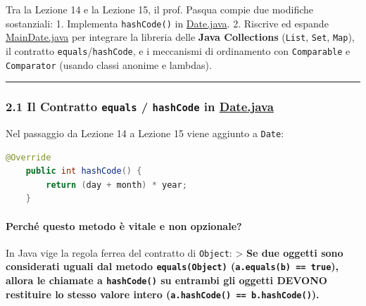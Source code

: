 \documentclass[11pt,a4paper]{article}
\newcommand{\passthrough}[1]{#1}
\begin{document}
Tra la Lezione 14 e la Lezione 15, il prof. Pasqua compie due modifiche
sostanziali: 1. Implementa \passthrough{\lstinline!hashCode()!} in
\href{file:///home/wally/Documenti/GitHub/Programmazione-II/25-26/Teoria-e-Esercitazioni/Codice-20260902/Lezione15/MavenDate/src/main/java/it/oop/core/Date.java\#L102-L105}{Date.java}.
2. Riscrive ed espande
\href{file:///home/wally/Documenti/GitHub/Programmazione-II/25-26/Teoria-e-Esercitazioni/Codice-20260902/Lezione15/MavenDate/src/main/java/it/oop/ui/MainDate.java}{MainDate.java}
per integrare la libreria delle \textbf{Java Collections}
(\passthrough{\lstinline!List!}, \passthrough{\lstinline!Set!},
\passthrough{\lstinline!Map!}), il contratto
\passthrough{\lstinline!equals!}/\passthrough{\lstinline!hashCode!}, e i
meccanismi di ordinamento con \passthrough{\lstinline!Comparable!} e
\passthrough{\lstinline!Comparator!} (usando classi anonime e lambdas).

\begin{center}\rule{0.5\linewidth}{0.5pt}\end{center}

\subsubsection{\texorpdfstring{2.1 Il Contratto \texttt{equals} /
\texttt{hashCode} in
\href{file:///home/wally/Documenti/GitHub/Programmazione-II/25-26/Teoria-e-Esercitazioni/Codice-20260902/Lezione15/MavenDate/src/main/java/it/oop/core/Date.java\#L102-L105}{Date.java}}{2.1 Il Contratto equals / hashCode in Date.java}}\label{il-contratto-equals-hashcode-in-date.java}

Nel passaggio da Lezione 14 a Lezione 15 viene aggiunto a
\passthrough{\lstinline!Date!}:

\begin{lstlisting}[language=Java]
    @Override
    public int hashCode() {
        return (day + month) * year;
    }
\end{lstlisting}

\paragraph{Perché questo metodo è vitale e non
opzionale?}\label{perchuxe9-questo-metodo-uxe8-vitale-e-non-opzionale}

In Java vige la regola ferrea del contratto di
\passthrough{\lstinline!Object!}: \textgreater{} \textbf{Se due oggetti
sono considerati uguali dal metodo
\passthrough{\lstinline!equals(Object)!}
(\passthrough{\lstinline!a.equals(b) == true!}), allora le chiamate a
\passthrough{\lstinline!hashCode()!} su entrambi gli oggetti DEVONO
restituire lo stesso valore intero
(\passthrough{\lstinline!a.hashCode() == b.hashCode()!}).}
\end{document}
